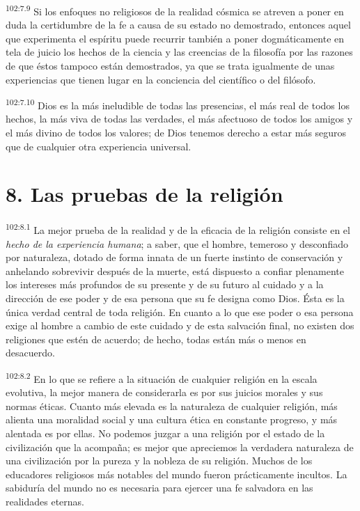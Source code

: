 \par
\textsuperscript{102:7.9} Si los enfoques no religiosos de la realidad cósmica se atreven a poner en duda la certidumbre de la fe a causa de su estado no demostrado, entonces aquel que experimenta el espíritu puede recurrir también a poner dogmáticamente en tela de juicio los hechos de la ciencia y las creencias de la filosofía por las razones de que éstos tampoco están demostrados, ya que se trata igualmente de unas experiencias que tienen lugar en la conciencia del científico o del filósofo.

\par
\textsuperscript{102:7.10} Dios es la más ineludible de todas las presencias, el más real de todos los hechos, la más viva de todas las verdades, el más afectuoso de todos los amigos y el más divino de todos los valores; de Dios tenemos derecho a estar más seguros que de cualquier otra experiencia universal.

\section*{8. Las pruebas de la religión}
\par
\textsuperscript{102:8.1} La mejor prueba de la realidad y de la eficacia de la religión consiste en el \textit{hecho de la experiencia humana}; a saber, que el hombre, temeroso y desconfiado por naturaleza, dotado de forma innata de un fuerte instinto de conservación y anhelando sobrevivir después de la muerte, está dispuesto a confiar plenamente los intereses más profundos de su presente y de su futuro al cuidado y a la dirección de ese poder y de esa persona que su fe designa como Dios. Ésta es la única verdad central de toda religión. En cuanto a lo que ese poder o esa persona exige al hombre a cambio de este cuidado y de esta salvación final, no existen dos religiones que estén de acuerdo; de hecho, todas están más o menos en desacuerdo.

\par
\textsuperscript{102:8.2} En lo que se refiere a la situación de cualquier religión en la escala evolutiva, la mejor manera de considerarla es por sus juicios morales y sus normas éticas. Cuanto más elevada es la naturaleza de cualquier religión, más alienta una moralidad social y una cultura ética en constante progreso, y más alentada es por ellas. No podemos juzgar a una religión por el estado de la civilización que la acompaña; es mejor que apreciemos la verdadera naturaleza de una civilización por la pureza y la nobleza de su religión. Muchos de los educadores religiosos más notables del mundo fueron prácticamente incultos. La sabiduría del mundo no es necesaria para ejercer una fe salvadora en las realidades eternas.

